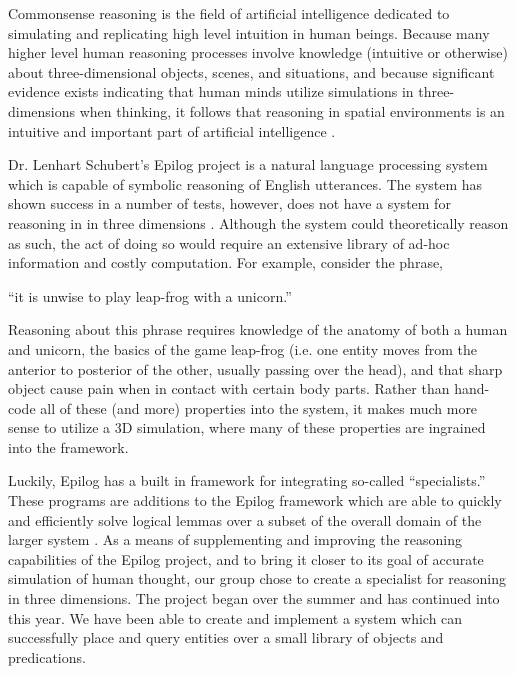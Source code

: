 Commonsense reasoning is the field of artificial intelligence dedicated to simulating and replicating high level intuition in human beings. 
Because many higher level human reasoning processes involve knowledge (intuitive or otherwise) about three-dimensional objects, scenes, and situations, and because significant evidence exists indicating that human minds utilize simulations in three-dimensions when thinking, it follows that reasoning in spatial environments is an intuitive and important part of artificial intelligence \cite{selman1998analogical}. 

Dr. Lenhart Schubert's Epilog project is a natural language processing system which is capable of symbolic reasoning of English utterances. 
The system has shown success in a number of tests, however, does not have a system for reasoning in in three dimensions \cite{schubert2000episodic}. 
Although the system could theoretically reason as such, the act of doing so would require an extensive library of ad-hoc information and costly computation. For example, consider the phrase,

\begin{center} “it is unwise to play leap-frog with a unicorn.” \end{center}

Reasoning about this phrase requires knowledge of the anatomy of both a human and unicorn, the basics of the game leap-frog (i.e. one entity moves from the anterior to posterior of the other, usually passing over the head), and that sharp object cause pain when in contact with certain body parts. 
Rather than hand-code all of these (and more) properties into the system, it makes much more sense to utilize a 3D simulation, where many of these properties are ingrained into the framework.

Luckily, Epilog has a built in framework for integrating so-called “specialists.” 
These programs are additions to the Epilog framework which are able to quickly and efficiently solve logical lemmas over a subset of the overall domain of the larger system \cite{schubert1983determining,schubert1987accelerating,schubert2000episodic}. As a means of supplementing and improving the reasoning capabilities of the Epilog project, and to bring it closer to its goal of accurate simulation of human thought, our group chose to create a specialist for reasoning in three dimensions. 
The project began over the summer and has continued into this year. We have been able to create and implement a system which can successfully place and query entities over a small library of objects and predications.